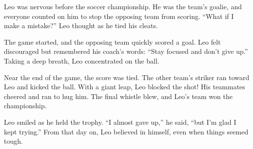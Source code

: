 \documentclass[12pt]{article}
\begin{document}
\begin{tcolorbox}[colframe=black!60, colback=white, 
coltitle=black, colbacktitle=black!15, fonttitle=\bfseries\Large, 
title=Text: Leo and the Big Game, halign title=center, left=10pt, right=10pt, top=10pt, bottom=15pt]
Leo was nervous before the soccer championship. He was the team’s goalie, and everyone counted on him to stop the opposing team from scoring. “What if I make a mistake?” Leo thought as he tied his cleats.

The game started, and the opposing team quickly scored a goal. Leo felt discouraged but remembered his coach’s words: “Stay focused and don’t give up.” Taking a deep breath, Leo concentrated on the ball.

Near the end of the game, the score was tied. The other team’s striker ran toward Leo and kicked the ball. With a giant leap, Leo blocked the shot! His teammates cheered and ran to hug him. The final whistle blew, and Leo’s team won the championship.

Leo smiled as he held the trophy. “I almost gave up,” he said, “but I’m glad I kept trying.” From that day on, Leo believed in himself, even when things seemed tough.
\end{tcolorbox}
\end{document}
